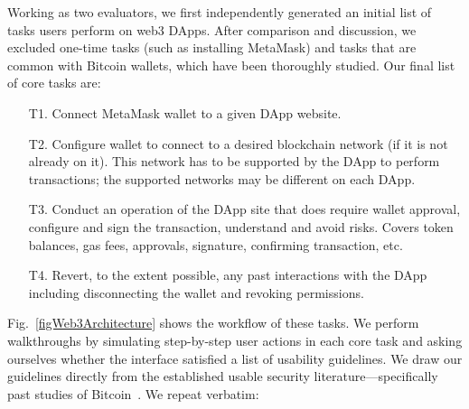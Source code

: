 \documentclass[conference]{IEEEtran}
\begin{document}
Working as two evaluators, we first independently generated an initial list of tasks users perform on web3 DApps. After comparison and discussion, we excluded one-time tasks (such as installing MetaMask) and tasks that are common with Bitcoin wallets, which have been thoroughly studied. Our final list of core tasks are:

\begin{enumerate}
    \item [T1.] Connect MetaMask wallet to a given DApp website. %
    \item [T2.] Configure wallet to connect to a desired blockchain network (if it is not already on it). This network has to be supported by the DApp to perform transactions; the supported networks may be different on each DApp. %
    \item [T3.] Conduct an operation of the DApp site that does require wallet approval, configure and sign the transaction, understand and avoid risks. Covers token balances, gas fees, approvals, signature, confirming transaction, etc. %
	\item [T4.] Revert, to the extent possible, any past interactions with the DApp including disconnecting the wallet and revoking permissions.
\end{enumerate}

Fig.~\ref{figWeb3Architecture} shows the workflow of these tasks.
We perform walkthroughs by simulating step-by-step user actions in each core task and asking ourselves whether the interface satisfied a list of usability guidelines.
We draw our guidelines directly from the established usable security literature---specifically past studies of Bitcoin~\cite{eskandari2018first,moniruzzaman2020examining}. We repeat verbatim:
\end{document}
